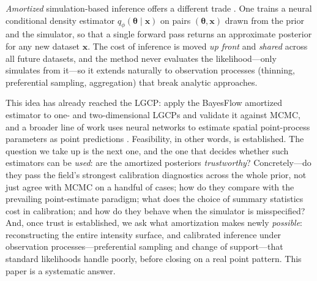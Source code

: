 \documentclass[11pt]{article}
\newcommand{\thetavec}{\boldsymbol{\theta}}
\newcommand{\xvec}{\mathbf{x}}
\begin{document}
\emph{Amortized} simulation-based inference offers a different trade
\citep{cranmer2020frontier,zammitmangion2025neural}. One trains a neural
conditional density estimator $q_\phi(\thetavec\mid\xvec)$ on pairs
$(\thetavec,\xvec)$ drawn from the prior and the simulator, so that a single
forward pass returns an approximate posterior for any new dataset $\xvec$. The
cost of inference is moved \emph{up front} and \emph{shared} across all future
datasets, and the method never evaluates the likelihood---only simulates from
it---so it extends naturally to observation processes (thinning, preferential
sampling, aggregation) that break analytic approaches.

This idea has already reached the LGCP: \citet{wang2025inference} apply the
BayesFlow amortized estimator \citep{radev2020bayesflow} to one- and
two-dimensional LGCPs and validate it against MCMC, and a broader line of work
uses neural networks to estimate spatial point-process parameters as point
predictions \citep{vihrs2022using}. Feasibility, in other words, is established.
The question we take up is the next one, and the one that decides whether such
estimators can be \emph{used}: are the amortized posteriors \emph{trustworthy}?
Concretely---do they pass the field's strongest calibration diagnostics across
the whole prior, not just agree with MCMC on a handful of cases; how do they
compare with the prevailing point-estimate paradigm; what does the choice of
summary statistics cost in calibration; and how do they behave when the
simulator is misspecified? And, once trust is established, we ask what
amortization makes newly \emph{possible}: reconstructing the entire intensity
surface, and calibrated inference under observation processes---preferential
sampling and change of support---that standard likelihoods handle poorly, before
closing on a real point pattern. This paper is a systematic answer.
\end{document}
